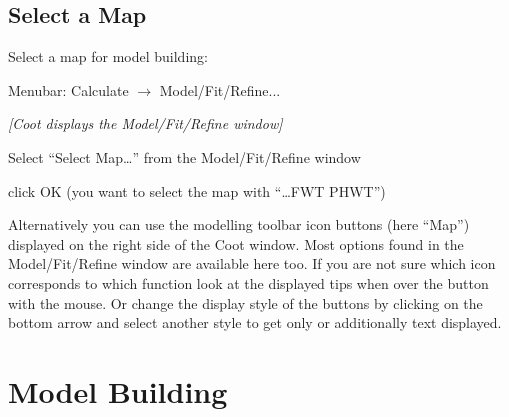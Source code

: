 \documentclass{article}
\begin{document}
\subsection{Select a Map}
Select a map for model building:

\begin{trivlist}

\item Menubar: \textsf{Calculate $\rightarrow$ Model/Fit/Refine...}

\textsl{ [Coot displays the Model/Fit/Refine window]}

\item Select \textsf{``Select Map\ldots''} from the Model/Fit/Refine
  window

\item click OK (you want to select the map with ``\ldots FWT PHWT'')

Alternatively you can use the modelling toolbar icon buttons (here
``Map'') displayed on the right side of the Coot window. Most
options found in the Model/Fit/Refine window are available here too.
If you are not sure which icon corresponds to which function look at
the displayed tips when over the button with the mouse. Or change
the display style of the buttons by clicking on the bottom arrow and
select another style to get only or additionally text displayed.
  
\end{trivlist}



\section{Model Building}
\end{document}
